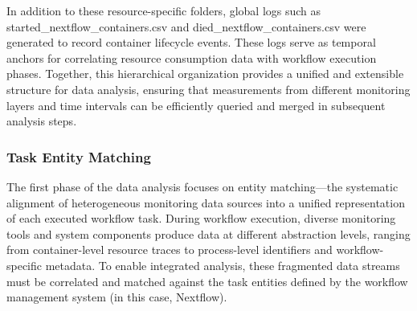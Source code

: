 In addition to these resource-specific folders, global logs such as started_nextflow_containers.csv and died_nextflow_containers.csv were generated to record container lifecycle events. These logs serve as temporal anchors for correlating resource consumption data with workflow execution phases. Together, this hierarchical organization provides a unified and extensible structure for data analysis, ensuring that measurements from different monitoring layers and time intervals can be efficiently queried and merged in subsequent analysis steps.
\subsubsection{Task Entity Matching}
\label{sec:task_entity_matching}
The first phase of the data analysis focuses on entity matching—the systematic alignment of heterogeneous monitoring data sources into a unified representation of each executed workflow task. During workflow execution, diverse monitoring tools and system components produce data at different abstraction levels, ranging from container-level resource traces to process-level identifiers and workflow-specific metadata. To enable integrated analysis, these fragmented data streams must be correlated and matched against the task entities defined by the workflow management system (in this case, Nextflow).


